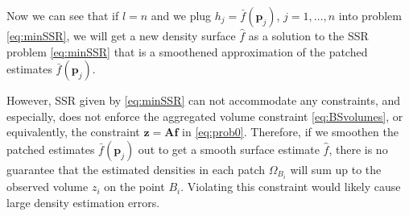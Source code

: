 

Now we can see that if $l=n$ and we plug $h_j = \bar f(\mathbf p_j)$, $j=1,\ldots,n$ into problem \eqref{eq:minSSR}, we will get a new density surface $\hat f$ as a solution to the SSR problem \eqref{eq:minSSR} that is a smoothened approximation of the patched estimates $\bar f(\mathbf p_j)$.

However, SSR given by \eqref{eq:minSSR}
can not accommodate any constraints, and especially, does not enforce the aggregated volume constraint \eqref{eq:BSvolumes}, or equivalently, the constraint $\mathbf z = \mathbf A\mathbf f$ in  \eqref{eq:prob0}. Therefore, if we smoothen the patched estimates $\bar f(\mathbf p_j)$ out to get a smooth surface estimate $\hat f$, there is no guarantee that the estimated densities in each patch $\Omega_{B_i}$ will sum up to the observed volume $z_i$ on the point $B_i$. Violating this constraint would likely cause large density estimation errors.